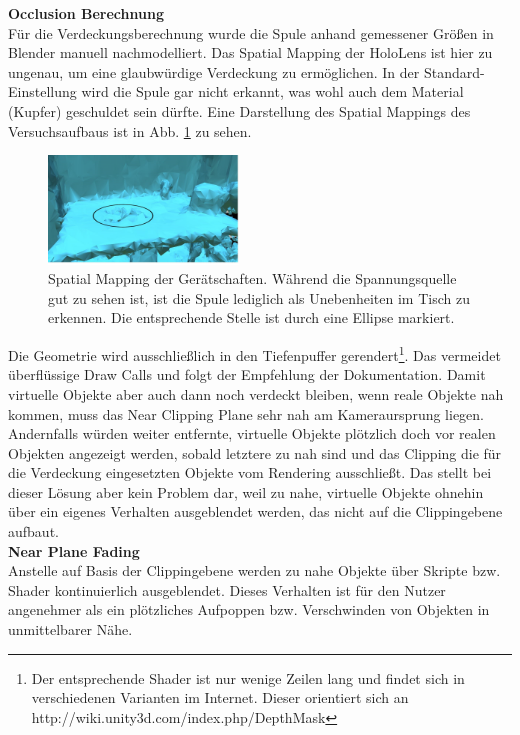 \textbf{Occlusion Berechnung}\\
Für die Verdeckungsberechnung wurde die Spule anhand gemessener Größen in Blender manuell nachmodelliert. Das Spatial Mapping der HoloLens ist hier zu ungenau, um eine glaubwürdige Verdeckung zu ermöglichen. In der Standard-Einstellung wird die Spule gar nicht erkannt, was wohl auch dem Material (Kupfer) geschuldet sein dürfte. Eine Darstellung des Spatial Mappings des Versuchsaufbaus ist in Abb. \ref{img:mesh-vs-model} zu sehen.
\begin{figure}[h!]
	\centering
	\includegraphics[width=0.45\textwidth]{images/HL/mesh.jpg}
	\caption{Spatial Mapping der Gerätschaften. Während die Spannungsquelle gut zu sehen ist, ist die Spule lediglich als Unebenheiten im Tisch zu erkennen. Die entsprechende Stelle ist durch eine Ellipse markiert.}
	\label{img:mesh-vs-model}
\end{figure}
Die Geometrie wird ausschließlich in den Tiefenpuffer gerendert\footnote{Der entsprechende Shader ist nur wenige Zeilen lang und findet sich in verschiedenen Varianten im Internet. Dieser orientiert sich an http://wiki.unity3d.com/index.php/DepthMask}. Das vermeidet überflüssige Draw Calls und folgt der Empfehlung der Dokumentation. Damit virtuelle Objekte aber auch dann noch verdeckt bleiben, wenn reale Objekte nah kommen, muss das Near Clipping Plane sehr nah am Kameraursprung liegen. Andernfalls würden weiter entfernte, virtuelle Objekte plötzlich doch vor realen Objekten angezeigt werden, sobald letztere zu nah sind und das Clipping die für die Verdeckung eingesetzten Objekte vom Rendering ausschließt. Das stellt bei dieser Lösung aber kein Problem dar, weil zu nahe, virtuelle Objekte ohnehin über ein eigenes Verhalten ausgeblendet werden, das nicht auf die Clippingebene aufbaut.\\


\textbf{Near Plane Fading}\\
Anstelle auf Basis der Clippingebene werden zu nahe Objekte über Skripte bzw. Shader kontinuierlich ausgeblendet. Dieses Verhalten ist für den Nutzer angenehmer als ein plötzliches Aufpoppen bzw. Verschwinden von Objekten in unmittelbarer Nähe.\\

